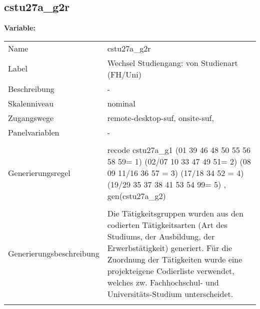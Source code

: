 	
	
	\subsection{cstu27a\_g2r}
	\label{subSection:cstu27a_g2r}

	\noindent\textbf{Variable:}\\
		\begin{tabular}{lL{11.3cm}}
			\label{tableVariable:cstu27a_g2r}
			Name & cstu27a\_g2r \\
			Label & Wechsel Studiengang: von Studienart (FH/Uni) \\
			Beschreibung & - \\
			Skalenniveau & nominal \\
			Zugangswege &
				remote-desktop-suf,
				onsite-suf,
 \\
			Panelvariablen & -
			 \\
			 \\
					Generierungsregel & recode cstu27a\_g1  (01 39 46 48 50 55 56 58 59= 1) (02/07 10 33 47 49 51= 2) (08 09 11/16 36 57 = 3) (17/18 34 52 = 4) (19/29 35 37 38 41 53 54 99= 5) , gen(cstu27a\_g2) \\
				 \\
					Generierungsbeschreibung & Die Tätigkeitsgruppen wurden aus den codierten Tätigkeitsarten (Art des Studiums, der Ausbildung, der Erwerbstätigkeit) generiert. Für die Zuordnung der Tätigkeiten wurde eine projekteigene Codierliste verwendet, welches zw. Fachhochschul- und Universitäts-Studium unterscheidet.
				 \\	
			 \\
		\end{tabular}






